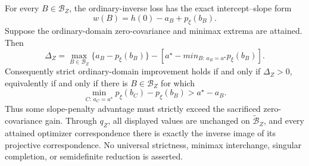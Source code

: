 For every \(B\in\mathcal B_Z\), the ordinary-inverse loss has the exact intercept--slope form
\[
w(B)=h(0)-a_B+p_\xi(b_B).
\]
Suppose the ordinary-domain zero-covariance and minimax extrema are attained.  Then
\[
\Delta_Z=
\max_{B\in\mathcal B_Z}\{a_B-p_\xi(b_B)\}
-\left[a^\star-min_{B:\,a_B=a^\star}p_\xi(b_B)\right].
\]
Consequently strict ordinary-domain improvement holds if and only if \(\Delta_Z>0\), equivalently if and only if there is \(B\in\mathcal B_Z\) for which
\[
\min_{C:\,a_C=a^\star}p_\xi(b_C)-p_\xi(b_B)
>a^\star-a_B.
\]
Thus some slope-penalty advantage must strictly exceed the sacrificed zero-covariance gain.  Through \(q_Z\), all displayed values are unchanged on \(\widetilde{\mathcal B}_Z\), and every attained optimizer correspondence there is exactly the inverse image of its projective correspondence.  No universal strictness, minimax interchange, singular completion, or semidefinite reduction is asserted.